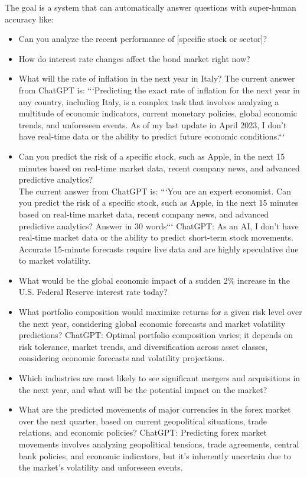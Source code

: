 \documentclass[11pt, reqno]{amsart}
\theoremstyle{definition}
\theoremstyle{remark}
\begin{document}
	The goal is a system that can automatically answer questions with super-human
	accuracy like:
	\begin{itemize}
		\item Can you analyze the recent performance of [specific stock or
			sector]?

		\item How do interest rate changes affect the bond market right now?

		\item What will the rate of inflation in the next year in Italy?
            The current answer from ChatGPT is:
            ```Predicting the exact rate of inflation for the next year in any
            country, including Italy, is a complex task that involves analyzing
            a multitude of economic indicators, current monetary policies,
            global economic trends, and unforeseen events. As of my last update
            in April 2023, I don't have real-time data or the ability to
            predict future economic conditions.```

		\item Can you predict the risk of a specific stock, such as Apple, in the
			next 15 minutes based on real-time market data, recent company news, and
			advanced predictive analytics? \\
            The current answer from ChatGPT is: ```You
			are an expert economist. Can you predict the risk of a specific stock,
			such as Apple, in the next 15 minutes based on real-time market data,
			recent company news, and advanced predictive analytics? Answer in 30 words```
			ChatGPT: As an AI, I don't have real-time market data or the ability to
			predict short-term stock movements. Accurate 15-minute forecasts
			require live data and are highly speculative due to market volatility.

		\item What would be the global economic impact of a sudden 2\% increase
			in the U.S. Federal Reserve interest rate today?

		\item What portfolio composition would maximize returns for a given risk
			level over the next year, considering global economic forecasts and
			market volatility predictions? ChatGPT: Optimal portfolio composition
			varies; it depends on risk tolerance, market trends, and diversification
			across asset classes, considering economic forecasts and volatility
			projections.

		\item Which industries are most likely to see significant mergers and acquisitions
			in the next year, and what will be the potential impact on the market?

		\item What are the predicted movements of major currencies in the forex
			market over the next quarter, based on current geopolitical
			situations, trade relations, and economic policies? ChatGPT:
			Predicting forex market movements involves analyzing geopolitical
			tensions, trade agreements, central bank policies, and economic indicators,
			but it's inherently uncertain due to the market's volatility and
			unforeseen events.
	\end{itemize}
\end{document}
